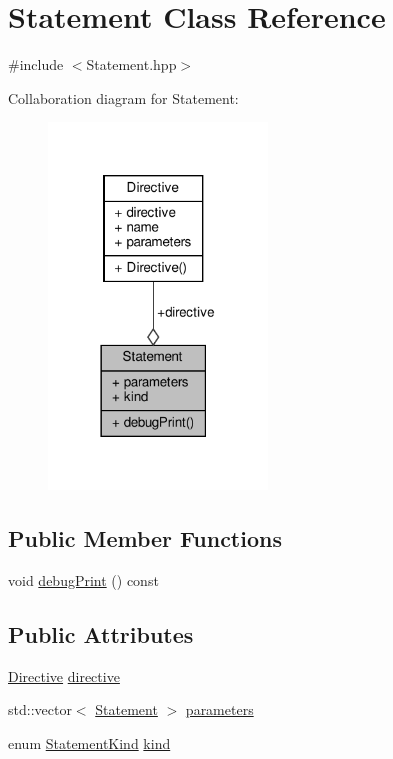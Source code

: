 \hypertarget{classft_1_1_statement}{}\section{Statement Class Reference}
\label{classft_1_1_statement}


{\ttfamily \#include $<$Statement.\+hpp$>$}



Collaboration diagram for Statement\+:
\nopagebreak
\begin{figure}[H]
\begin{center}
\leavevmode
\includegraphics[width=165pt]{classft_1_1_statement__coll__graph}
\end{center}
\end{figure}
\subsection*{Public Member Functions}
\begin{DoxyCompactItemize}
\item 
void \hyperlink{classft_1_1_statement_ad5cb0ada03653eb2e1c8947f05c07ad6}{debug\+Print} () const
\end{DoxyCompactItemize}
\subsection*{Public Attributes}
\begin{DoxyCompactItemize}
\item 
\hyperlink{classft_1_1_directive}{Directive} \hyperlink{classft_1_1_statement_a0ab2276aaeac8d93ba6642c22ded7ba9}{directive}
\item 
std\+::vector$<$ \hyperlink{classft_1_1_statement}{Statement} $>$ \hyperlink{classft_1_1_statement_aa3968f0789a0c0354fd565636082d043}{parameters}
\item 
enum \hyperlink{namespaceft_a1cc6ed80039d68c038ae5982fb6b2ca4}{Statement\+Kind} \hyperlink{classft_1_1_statement_ad4e117b2f59a58b0f0091c8fa8bbcb55}{kind}
\end{DoxyCompactItemize}


